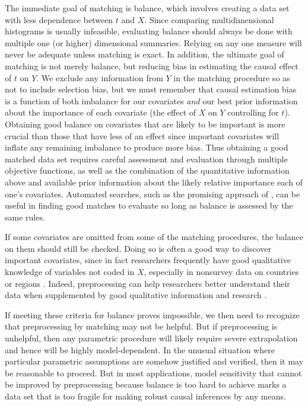 \documentclass[11pt,titlepage]{article}
\begin{document}
The immediate goal of matching is balance, which involves creating a
data set with less dependence between $t$ and $X$.  Since comparing
multidimensional histograms is usually infeasible, evaluating balance
should always be done with multiple one (or higher) dimensional
summaries.  Relying on any one measure will never be adequate unless
matching is exact.  In addition, the ultimate goal of matching is not
merely balance, but reducing bias in estimating the causal effect of
$t$ on $Y$.  We exclude any information from $Y$ in the matching
procedure so as not to include selection bias, but we must remember
that causal estimation bias is a function of both imbalance for our
covariates \emph{and} our best prior information about the importance
of each covariate (the effect of $X$ on $Y$ controlling for $t$).
Obtaining good balance on covariates that are likely to be important
is more crucial than those that have less of an effect since important
covariates will inflate any remaining imbalance to produce more bias.
Thus obtaining a good matched data set requires careful assessment and
evaluation through multiple objective functions, as well as the
combination of the quantitative information above and available prior
information about the likely relative importance each of one's
covariates.  Automated searches, such as the promising approach of
\citet{DiaSek05}, can be useful in finding good matches to evaluate so
long as balance is assessed by the same rules.

If some covariates are omitted from some of the matching procedures,
the balance on them should still be checked.  Doing so is often a good
way to discover important covariates, since in fact researchers
frequently have good qualitative knowledge of variables not coded in
$X$, especially in nonsurvey data on countries or regions
\citep[][Ch.3]{Rosenbaum02}.  Indeed, preprocessing can help
researchers better understand their data when supplemented by good
qualitative information and research \citep[e.g.,][]{RosSil01}.

If meeting these criteria for balance proves impossible, we then need
to recognize that preprocessing by matching may not be helpful.  But
if preprocessing is unhelpful, then any parametric procedure will
likely require severe extrapolation and hence will be highly
model-dependent.  In the unusual situation where particular parametric
assumptions are somehow justified and verified, then it may be
reasonable to proceed.  But in most applications, model sensitivity
that cannot be improved by preprocessing because balance is too hard
to achieve marks a data set that is too fragile for making robust
causal inferences by any means.
\end{document}

